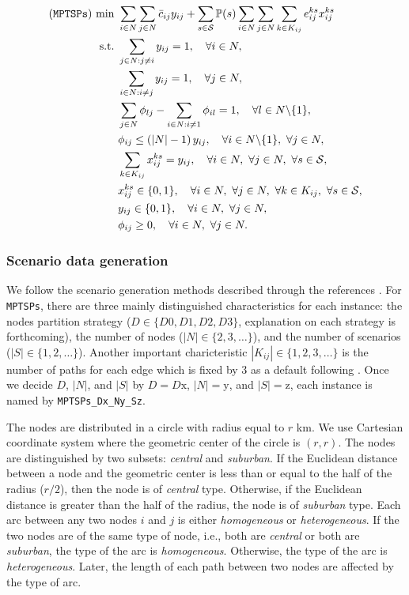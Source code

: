 \begin{subequations}
\begin{align}
(\texttt{MPTSPs})\ \textrm{min}\ &\sum_{i\in N}\sum_{j\in N}\bar{c}_{ij}y_{ij}+\sum_{s\in \mathcal{S}}\PP(s)\sum_{i\in N}\sum_{j\in N}\sum_{k\in K_{ij}}e_{ij}^{ks}x_{ij}^{ks} \\
\textrm{s.t.}\ &\sum_{j\in N:j\neq i}y_{ij}=1,\quad\forall i\in N,\\
&\sum_{i\in N:i\neq j}y_{ij}=1,\quad\forall j\in N,\\
&\sum_{j\in N}\phi_{lj}-\sum_{i\in N: i\neq 1}\phi_{il}=1,\quad\forall l\in N\backslash\{1\},\\
&\phi_{ij}\le \left(|N|-1\right)y_{ij},\quad\forall i\in N\backslash\{1\},\ \forall j\in N,\\
&\sum_{k\in K_{ij}}x_{ij}^{ks}=y_{ij},\quad\forall i\in N,\ \forall j\in N,\ \forall s\in \mathcal{S}, \\
&x_{ij}^{ks}\in\{0,1\},\quad\forall i\in N,\ \forall j\in N,\ \forall k\in K_{ij},\ \forall s\in \mathcal{S},\\
&y_{ij}\in \{0,1\},\quad \forall i\in N,\ \forall j\in N,\\
&\phi_{ij} \ge 0, \quad \forall i\in N,\ \forall j\in N.
\end{align}
\end{subequations}

\subsubsection{Scenario data generation}
We follow the scenario generation methods described through the references \cite{journal:MPT2014,journal:PGM2017,journal:TPP2017}. For \texttt{MPTSPs}, there are three mainly distinguished characteristics for each instance: the nodes partition strategy ($D\in\{D0,D1,D2,D3\}$, explanation on each strategy is forthcoming), the number of nodes ($|N|\in\{2,3,\ldots\}$), and the number of scenarios ($|S|\in\{1,2,\ldots\}$). Another important charicteristic $|K_{ij}|\in\{1,2,3,\ldots\}$ is the number of paths for each edge which is fixed by 3 as a default following \cite{journal:TPP2017}. Once we decide $D$, $|N|$, and $|S|$ by $D=D\textrm{x}$, $|N|=\textrm{y}$, and $|S|=\textrm{z}$, each instance is named by \texttt{MPTSPs\_Dx\_Ny\_Sz}.

The nodes are distributed in a circle with radius equal to $r$ km. We use Cartesian coordinate system where the geometric center of the circle is $(r,r)$. The nodes are distinguished by two subsets: \textit{central} and \textit{suburban}. If the Euclidean distance between a node and the geometric center is less than or equal to the half of the radius ($r/2$), then the node is of \textit{central} type. Otherwise, if the Euclidean distance is greater than the half of the radius, the node is of \textit{suburban} type. Each arc between any two nodes $i$ and $j$ is either \textit{homogeneous} or \textit{heterogeneous}. If the two nodes are of the same type of node, i.e., both are \textit{central} or both are \textit{suburban}, the type of the arc is \textit{homogeneous}. Otherwise, the type of the arc is \textit{heterogeneous}. Later, the length of each path between two nodes are affected by the type of arc. 

